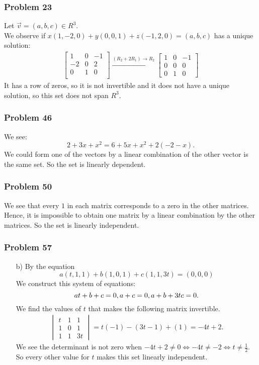 \documentclass[a4paper,12pt]{article}
\begin{document}
\subsubsection*{Problem 23}
Let $\vec{v}=(a,b,c)\in R^3$.\\ We observe if $x(1,-2,0)+y(0,0,1)+z(-1,2,0)=(a,b,c)$ has a unique solution:
\begin{align*}
\begin{bmatrix}
    1&0&-1\\
    -2&0&2\\
    0&1&0\\
\end{bmatrix} \xrightarrow{{(R_2+2R_1)}\to{R_2}} \begin{bmatrix}
  1 & 0 & -1 \\
  0 & 0 & 0 \\
  0 & 1 & 0
\end{bmatrix}
\end{align*}
It has a row of zeros, so it is not invertible and it does not have a unique solution, so this set does not span $R^3.$
\subsubsection*{Problem 46}
We see:
\[2+3x+x^2=6+5x+x^2+2(-2-x).\]
We could form one of the vectors by a linear combination of the other vector is the same set. So the set is linearly dependent.
\subsubsection*{Problem 50}
We see that every $1$ in each matrix corresponds to a zero in the other matrices. Hence, it is impossible to obtain one matrix by a linear combination by the other matrices. So the set is linearly independent.
\subsubsection*{Problem 57}
\begin{itemize}
    \item [b)] By the equation 
\[a(t,1,1)+b(1,0,1)+c(1,1,3t)=(0,0,0)\]
We construct this system of equations:
\[at+b+c=0,\\ a+c=0,\\ a+b+3tc=0.\]
We find the values of $t$ that makes the following matrix invertible.
\begin{align*}
    \begin{vmatrix}
      t & 1 & 1 \\
      1 & 0 & 1 \\
      1 & 1 & 3t
    \end{vmatrix} = t(-1)-(3t-1)+(1)=-4t+2.
\end{align*}
We see the determinant is not zero when $-4t+2 \neq 0 \iff -4t\neq -2 \iff t \neq \frac{1}{2}.$
So every other value for $t$ makes this set linearly independent.
\end{itemize}
\end{document}
